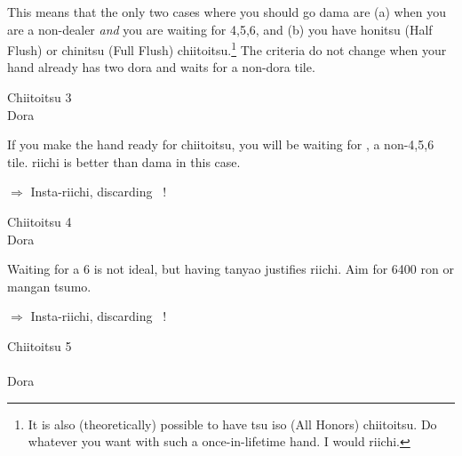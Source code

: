 \bigskip
\noindent This means that the only two cases where you should go {\jap dama} are (a) when you are a non-dealer \emph{and} you are waiting for 4,5,6, and (b) you have {\jap honitsu} (Half Flush) or {\jap chinitsu} (Full Flush) {\jap chiitoitsu}.\footnote{It is also (theoretically) possible to have  {\jap tsu iso} (All Honors) {\jap chiitoitsu}. Do whatever you want with such a once-in-lifetime hand. I would riichi.} The criteria do not change when your hand already has two {\jap dora} and waits for a non-{\jap dora} tile.

\bigskip
\begin{itembox}[r]{{\jap Chiitoitsu 3}}
\bp
{}\xi\xi\fa\fa~~\bei\\
\hfill\footnotesize{{\jap Dora}~~~~~~~}
\ep
\vspace{-15pt}
\end{itembox}

\noindent If you make the hand ready for {\jap chiitoitsu}, you will be waiting for {\LARGE{}}, a non-4,5,6 tile. riichi is better than {\jap dama} in this case. 

\begin{center}
{\Large $\Rightarrow$ Insta-riichi, discarding  ~!}
\end{center}

\bigskip
\begin{itembox}[r]{{\jap Chiitoitsu 4}}
\bp
{}~~\bei\\
\hfill\footnotesize{{\jap Dora}~~~~~~~}
\ep
\vspace{-15pt}
\end{itembox}

\noindent Waiting for a 6 is not ideal, but having {\jap tanyao} justifies riichi. Aim for 6400 {\jap ron} or {\jap mangan} {\jap tsumo}.

\begin{center}
{\Large $\Rightarrow$ Insta-riichi, discarding  ~!}
\end{center}

\bigskip
\begin{itembox}[r]{{\jap Chiitoitsu 5}}
\bp
{}\\ \vspace{-16pt}
\rfd{}\zhong\zhong\fa\fa~~\bei\\
\hfill\footnotesize{{\jap Dora}~~~~~~~}
\ep
\vspace{-15pt}
\end{itembox}

